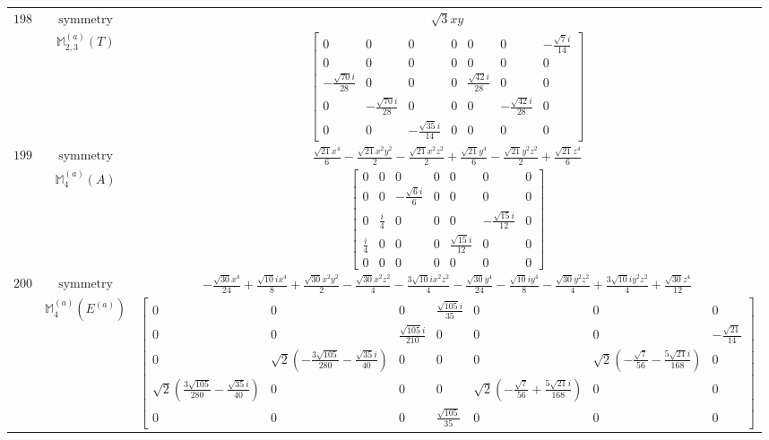 \documentclass[fleqn,8pt,landscape]{jsarticle}
\begin{document}
\begin{longtable}{ccc}
$ 198 $ & $ \text{symmetry} $ & $ \sqrt{3} x y $ \\
$  $ & $ \mathbb{M}_{2,3}^{(a)}(T) $ & $ \begin{bmatrix} 0 & 0 & 0 & 0 & 0 & 0 & - \frac{\sqrt{7} i}{14} \\ 0 & 0 & 0 & 0 & 0 & 0 & 0 \\ - \frac{\sqrt{70} i}{28} & 0 & 0 & 0 & \frac{\sqrt{42} i}{28} & 0 & 0 \\ 0 & - \frac{\sqrt{70} i}{28} & 0 & 0 & 0 & - \frac{\sqrt{42} i}{28} & 0 \\ 0 & 0 & - \frac{\sqrt{35} i}{14} & 0 & 0 & 0 & 0 \end{bmatrix} $ \\ \hline
$ 199 $ & $ \text{symmetry} $ & $ \frac{\sqrt{21} x^{4}}{6} - \frac{\sqrt{21} x^{2} y^{2}}{2} - \frac{\sqrt{21} x^{2} z^{2}}{2} + \frac{\sqrt{21} y^{4}}{6} - \frac{\sqrt{21} y^{2} z^{2}}{2} + \frac{\sqrt{21} z^{4}}{6} $ \\
$  $ & $ \mathbb{M}_{4}^{(a)}(A) $ & $ \begin{bmatrix} 0 & 0 & 0 & 0 & 0 & 0 & 0 \\ 0 & 0 & - \frac{\sqrt{6} i}{6} & 0 & 0 & 0 & 0 \\ 0 & \frac{i}{4} & 0 & 0 & 0 & - \frac{\sqrt{15} i}{12} & 0 \\ \frac{i}{4} & 0 & 0 & 0 & \frac{\sqrt{15} i}{12} & 0 & 0 \\ 0 & 0 & 0 & 0 & 0 & 0 & 0 \end{bmatrix} $ \\ \hline
$ 200 $ & $ \text{symmetry} $ & $ - \frac{\sqrt{30} x^{4}}{24} + \frac{\sqrt{10} i x^{4}}{8} + \frac{\sqrt{30} x^{2} y^{2}}{2} - \frac{\sqrt{30} x^{2} z^{2}}{4} - \frac{3 \sqrt{10} i x^{2} z^{2}}{4} - \frac{\sqrt{30} y^{4}}{24} - \frac{\sqrt{10} i y^{4}}{8} - \frac{\sqrt{30} y^{2} z^{2}}{4} + \frac{3 \sqrt{10} i y^{2} z^{2}}{4} + \frac{\sqrt{30} z^{4}}{12} $ \\
$  $ & $ \mathbb{M}_{4}^{(a)}(E^{(a)}) $ & $ \begin{bmatrix} 0 & 0 & 0 & \frac{\sqrt{105} i}{35} & 0 & 0 & 0 \\ 0 & 0 & \frac{\sqrt{105} i}{210} & 0 & 0 & 0 & - \frac{\sqrt{21}}{14} \\ 0 & \sqrt{2} \left(- \frac{3 \sqrt{105}}{280} - \frac{\sqrt{35} i}{40}\right) & 0 & 0 & 0 & \sqrt{2} \left(- \frac{\sqrt{7}}{56} - \frac{5 \sqrt{21} i}{168}\right) & 0 \\ \sqrt{2} \left(\frac{3 \sqrt{105}}{280} - \frac{\sqrt{35} i}{40}\right) & 0 & 0 & 0 & \sqrt{2} \left(- \frac{\sqrt{7}}{56} + \frac{5 \sqrt{21} i}{168}\right) & 0 & 0 \\ 0 & 0 & 0 & \frac{\sqrt{105}}{35} & 0 & 0 & 0 \end{bmatrix} $ \\ \hline

\end{longtable}
\end{document}
